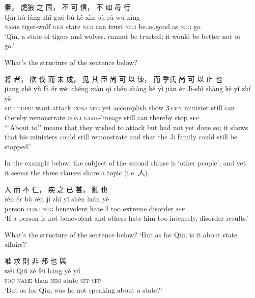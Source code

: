 \documentclass[UTF8, a4paper, oneside, scheme=plain, 12pt]{ctexrep}
\newcommand{\translate}[1]{`#1'}
\newcommand*{\category}[1]{\textsc{#1}}
\begin{document}
\begin{exe}
    \ex
    \glll 秦， 虎狼 之 国， 不 可 信， 不 如 毋 行 \\
    Qín hǔ-láng zhī guó bù kě xìn bù rú wú xíng \\
    \category{name} tiger-wolf \category{gen} state \category{neg} can trust \category{neg} be.as.good.as \category{neg} go \\
    \glt\translate{Qin, a state of tigers and wolves, cannot be trusted; it would be better not to go.}
\end{exe}

What's the structure of the sentence below?

\begin{exe}
    \ex
    \glll 將 者， 欲 伐 而 未 成， 见 其 臣 尚 可 以 谏， 而 季氏 尚 可 以 止 也 \\
    jiāng zhě yù fá ér wèi chéng xiàn qí chén shàng kě yǐ jiàn ér Jì-shì shàng kě yǐ zhǐ yě \\
    \category{fut} \category{topic} want attack \category{conj} \category{neg}.yet accomplish show 3.\category{gen} minister still can thereby remonstrate \category{conj} \category{name}-lineage still can thereby stop \category{sfp} \\
    \glt\translate{``About to'' means that they wished to attack but had not yet done so; it shows that his ministers could still remonstrate and that the Ji family could still be stopped.}
\end{exe}

In the example below, the subject of the second clause is \translate{other people},
and yet it seems the three clauses share a topic (i.e. 人).

\begin{exe}
    \ex
    \glll 人 而 不 仁， 疾 之 已 甚， 亂 也 \\
    rén ér bù rén jí zhī yǐ shèn luàn yě \\
    person \category{conj} \category{neg} benevolent hate 3 too extreme disorder \category{sfp} \\
    \glt\translate{If a person is not benevolent and others hate him too intensely, disorder results.}
\end{exe}

What's the structure of the sentence below? \translate{But as for Qiu, is it about state affairs?}

\begin{exe}
    \ex
    \glll 唯 求 則 非 邦 也 與 \\
    wéi Qiú zé fēi bāng yě yú \\
    \category{foc} \category{name} then \category{neg} state \category{sfp} \category{sfp} \\
    \glt\translate{But as for Qiu, was he not speaking about a state?}
\end{exe}
\end{document}

